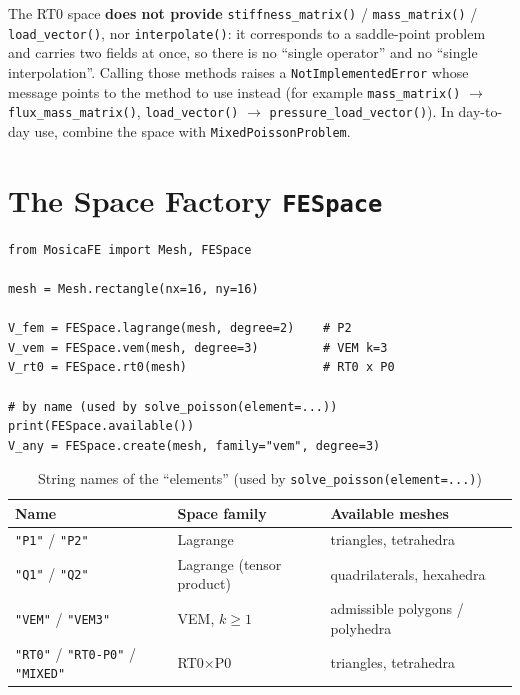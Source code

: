 \documentclass[11pt,oneside]{book}
\theoremstyle{definition}
\theoremstyle{plain}
\newenvironment{caution}{%
  \begin{tcolorbox}[colback=orange!5,colframe=orange!55,title=Caution,fonttitle=\bfseries]%
}{%
  \end{tcolorbox}%
}
\newcommand{\code}[1]{\texttt{#1}}
\begin{document}
\begin{caution}
The RT0 space \textbf{does not provide} \code{stiffness\_\allowbreak matrix()} /
\code{mass\_\allowbreak matrix()} / \code{load\_\allowbreak vector()}, nor \code{interpolate()}: it
corresponds to a saddle-point problem and carries two fields at once, so there is no
``single operator'' and no ``single interpolation''. Calling those methods raises a
\code{NotImplementedError} whose message points to the method to use instead (for
example \code{mass\_\allowbreak matrix()} $\to$ \code{flux\_\allowbreak mass\_\allowbreak matrix()},
\code{load\_\allowbreak vector()} $\to$ \code{pressure\_\allowbreak load\_\allowbreak vector()}). In day-to-day use,
combine the space with \code{MixedPoissonProblem}.
\end{caution}

\section{The Space Factory \code{FESpace}}

\begin{lstlisting}[language=MosicaFE,caption={The three space families}]
from MosicaFE import Mesh, FESpace

mesh = Mesh.rectangle(nx=16, ny=16)

V_fem = FESpace.lagrange(mesh, degree=2)    # P2
V_vem = FESpace.vem(mesh, degree=3)         # VEM k=3
V_rt0 = FESpace.rt0(mesh)                   # RT0 x P0

# by name (used by solve_poisson(element=...))
print(FESpace.available())
V_any = FESpace.create(mesh, family="vem", degree=3)
\end{lstlisting}

\begin{table}[htbp]
\centering
\caption{String names of the ``elements'' (used by \code{solve\_poisson(element=...)})}
\label{tab:elem-names}
\begin{lrbox}{\guideTableBox}
\begin{tabular}{@{}L{3.6cm}L{3.6cm}L{6.2cm}@{}}
\toprule
Name & Space family & Available meshes \\
\midrule
\code{"P1"} / \code{"P2"} & Lagrange & triangles, tetrahedra \\
\code{"Q1"} / \code{"Q2"} & Lagrange (tensor product) & quadrilaterals, hexahedra \\
\code{"VEM"} / \code{"VEM3"} & VEM, $k\ge1$ & admissible polygons / polyhedra \\
\code{"RT0"} / \code{"RT0-P0"} / \code{"MIXED"} & RT0$\times$P0 & triangles, tetrahedra \\
\bottomrule
\end{tabular}
\end{lrbox}%
\ifdim\wd\guideTableBox>\linewidth
  \resizebox{\linewidth}{!}{\usebox{\guideTableBox}}%
\else\usebox{\guideTableBox}\fi
\end{table}
\end{document}
